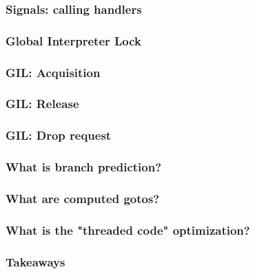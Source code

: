 \begin{frame}
\frametitle{Signals: calling handlers}
\end{frame}

\begin{frame}
\frametitle{Global Interpreter Lock}
\end{frame}

\begin{frame}
\frametitle{GIL: Acquisition}
\end{frame}

\begin{frame}
\frametitle{GIL: Release}
\end{frame}

\begin{frame}
\frametitle{GIL: Drop request}
\end{frame}

\begin{frame}
\frametitle{What is branch prediction?}
\end{frame}

\begin{frame}
\frametitle{What are computed gotos?}
\end{frame}

\begin{frame}
\frametitle{What is the "threaded code" optimization?}
\end{frame}

\begin{frame}
\frametitle{Takeaways}
\end{frame}


